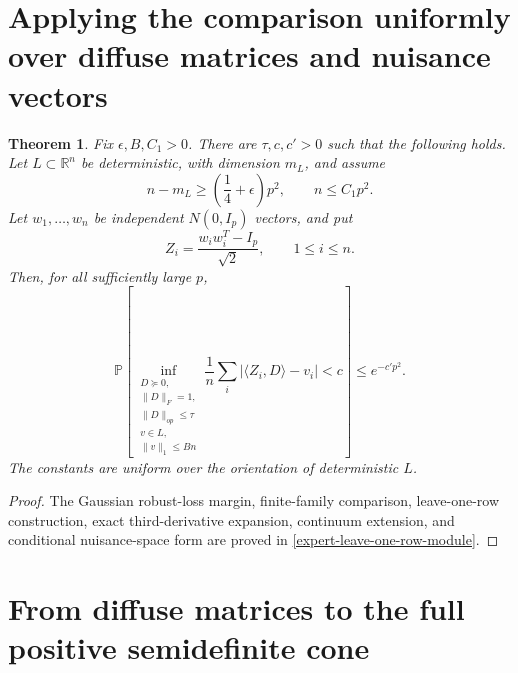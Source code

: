 \documentclass[11pt]{article}
\numberwithin{equation}{section}
\newtheorem{theorem}{Theorem}[section]
\theoremstyle{definition}
\theoremstyle{remark}
\newcommand{\R}{\mathbb R}
\newcommand{\Pp}{\mathbb P}
\newcommand{\1}{\boldsymbol 1}
\begin{document}
\section{Applying the comparison uniformly over diffuse
  matrices and nuisance
  vectors}\label{applying-the-comparison-uniformly-over-diffuse-matrices-and-nuisance-vectors}

\begin{aiblock}
 
\begin{theorem}\label{thm:diffuse-restatement}
  Fix $\epsilon,B,C_1>0$. There are $\tau,c,c'>0$ such that
  the following holds. Let $L\subset\R^n$ be
  deterministic, with dimension $m_L$, and assume
  \[
    n-m_L\ge\left(\frac14+\epsilon\right)p^2, \qquad
    n\le C_1p^2.
  \]
  Let $w_1,\ldots,w_n$ be independent $N(0,I_p)$ vectors,
  and put
  \[
    Z_i=\frac{w_iw_i^T-I_p}{\sqrt2}, \qquad 1\leq i\leq n.
  \]
  Then, for all sufficiently large $p$,
  \[
    \Pp\left[ \inf_{\substack{D\succeq0,\\ \|D\|_F=1,\\
    \|D\|_{op}\le\tau\\ v\in L,\\ \|v\|_1\le Bn}}
    \frac1n\sum_i|\langle Z_i,D\rangle-v_i|<c \right]\le
    e^{-c'p^2}.
  \]
  The constants are uniform over the orientation of
  deterministic $L$.
\end{theorem}

\begin{proof}
  The Gaussian robust-loss margin, finite-family
  comparison, leave-one-row construction, exact
  third-derivative expansion, continuum extension, and
  conditional nuisance-space form are proved in
  \cref{expert-leave-one-row-module}.
\end{proof}

\end{aiblock}



\section{From diffuse matrices to the full positive
  semidefinite
  cone}\label{fixed-rank-peeling-and-unsat-above-one-quarter}
\end{document}

